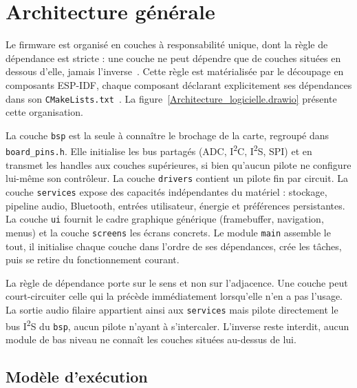 \section{Architecture générale}
\label{sec:archi}

Le firmware est organisé en couches à responsabilité unique, dont la règle de dépendance est stricte : une couche ne peut dépendre que de couches situées en dessous d'elle, jamais l'inverse~\cite{martin_clean_architecture}. Cette règle est matérialisée par le découpage en composants ESP-IDF, chaque composant déclarant explicitement ses dépendances dans son \texttt{CMakeLists.txt}~\cite{ESP32_IDF_guide}. La figure~\ref{Architecture_logicielle.drawio} présente cette organisation.


La couche \texttt{bsp} est la seule à connaître le brochage de la carte, regroupé dans \texttt{board\_pins.h}. Elle initialise les bus partagés (ADC, I\textsuperscript{2}C, I\textsuperscript{2}S, SPI) et en transmet les handles aux couches supérieures, si bien qu'aucun pilote ne configure lui-même son contrôleur. La couche \texttt{drivers} contient un pilote fin par circuit. La couche \texttt{services} expose des capacités indépendantes du matériel : stockage, pipeline audio, Bluetooth, entrées utilisateur, énergie et préférences persistantes. La couche \texttt{ui} fournit le cadre graphique générique (framebuffer, navigation, menus) et la couche \texttt{screens} les écrans concrets. Le module \texttt{main} assemble le tout, il initialise chaque couche dans l'ordre de ses dépendances, crée les tâches, puis se retire du fonctionnement courant.

La règle de dépendance porte sur le sens et non sur l'adjacence. Une couche peut court-circuiter celle qui la précède immédiatement lorsqu'elle n'en a pas l'usage. La sortie audio filaire appartient ainsi aux \texttt{services} mais pilote directement le bus I\textsuperscript{2}S du \texttt{bsp}, aucun pilote n'ayant à s'intercaler. L'inverse reste interdit, aucun module de bas niveau ne connaît les couches situées au-dessus de lui.

\subsection{Modèle d'exécution}

